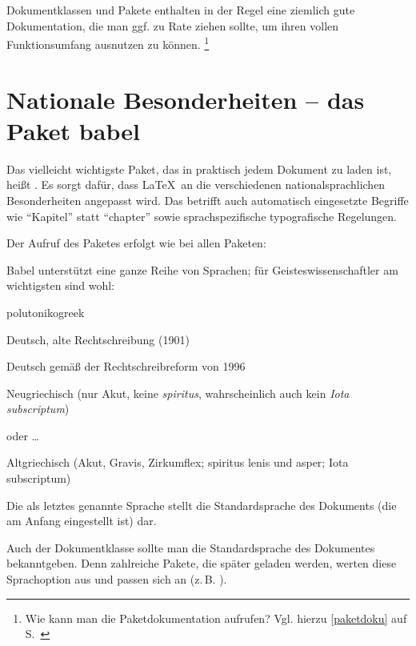 Dokumentklassen und Pakete enthalten in der Regel eine ziemlich gute Dokumentation, die man
ggf. zu Rate ziehen sollte, um ihren vollen Funktionsumfang ausnutzen zu können.%
\footnote{Wie kann man die Paketdokumentation aufrufen? 
    Vgl. hierzu \ref{paketdoku} auf S.~\pageref{paketdoku} }


\section{Nationale Besonderheiten -- das Paket babel}
\label{babel}


Das vielleicht wichtigste Paket, das in praktisch jedem Dokument zu laden ist, heißt .
Es sorgt dafür, dass \LaTeX\ an die verschiedenen nationalsprachlichen Besonderheiten angepasst wird.
Das betrifft auch automatisch eingesetzte Begriffe wie \enquote{Kapitel} statt \enquote{chapter} sowie
sprachspezifische typografische Regelungen.

Der Aufruf des Paketes  erfolgt wie bei allen Paketen: 

Babel unterstützt eine ganze Reihe von Sprachen; für Geisteswissenschaftler am wichtigsten sind
wohl:

\begin{labeling}{polutonikogreek}
 \item[german] Deutsch, alte Rechtschreibung (1901)
 \item[ngerman] Deutsch gemäß der Rechtschreibreform von 1996
 \item[greek] Neugriechisch (nur Akut, keine \emph{spiritus}, wahrscheinlich auch kein \emph{Iota subscriptum})
 \item[greek.ancient] oder \ldots 
 \item[polutonikogreek] Altgriechisch (Akut, Gravis, Zirkumflex; spiritus lenis und asper; Iota subscriptum)
\end{labeling}

Die als letztes genannte Sprache stellt die Standardsprache des Dokuments (die am Anfang
eingestellt ist) dar.

Auch der Dokumentklasse sollte man die Standardsprache des Dokumentes bekanntgeben.
Denn zahlreiche Pakete, die später geladen werden, werten diese Sprachoption aus und 
passen sich an (z.\,B. ).

